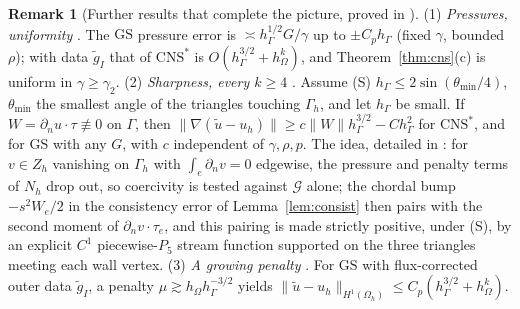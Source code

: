 \documentclass[5p,times]{elsarticle}
\theoremstyle{definition}
\newtheorem{remark}{Remark}
\newcommand{\hG}{h_\Gamma}
\newcommand{\hO}{h_\Omega}
\newcommand{\Gh}{\Gamma_h}
\newcommand{\Oh}{\Omega_h}
\newcommand{\Zh}{Z_h}
\newcommand{\dn}{\partial_n}
\newcommand{\ut}{\tilde u}
\newcommand{\norm}[1]{\lVert #1\rVert}
\newcommand{\GS}{\mathrm{GS}}
\newcommand{\CNS}{\mathrm{CNS}^\ast}
\newcommand{\Gc}{\mathcal G}
\newcommand{\ext}[1]{\cite[#1]{PadhiExt}}
\begin{document}
\begin{remark}[Further results that complete the picture, proved in \cite{PadhiExt}]\label{rem:further}
(1) \emph{Pressures, uniformity} \ext{Thms.~8.11, 8.7, 7.30, 7.33}. The $\GS$ pressure error is $\asymp\hG^{1/2}G/\gamma$ up to $\pm C_p\hG$ (fixed $\gamma$, bounded $\rho$); with data $\tilde g_I$ that of $\CNS$ is $O(\hG^{3/2}+\hO^k)$, and Theorem~\ref{thm:cns}(c) is uniform in $\gamma\ge\gamma_2$.
(2) \emph{Sharpness, every $k\ge4$} \ext{Thms.~7.8, 7.24}. Assume (S) $\hG\le2\sin(\theta_{\min}/4)$, $\theta_{\min}$ the smallest angle of the triangles touching $\Gh$, and let $\hG$ be small. If $W=\dn u\cdot\tau\not\equiv0$ on $\Gamma$, then $\norm{\nabla(\ut-u_h)}\ge c\norm W\hG^{3/2}-C\hG^2$ for $\CNS$, and for $\GS$ with any $G$, with $c$ independent of $\gamma,\rho,p$. The idea, detailed in \ext{Thm.~7.24}: for $v\in\Zh$ vanishing on $\Gh$ with $\int_e\dn v=0$ edgewise, the pressure and penalty terms of $N_h$ drop out, so coercivity is tested against $\Gc$ alone; the chordal bump $-s^2W_e/2$ in the consistency error of Lemma~\ref{lem:consist} then pairs with the second moment of $\dn v\cdot\tau_e$, and this pairing is made strictly positive, under (S), by an explicit $C^1$ piecewise-$P_5$ stream function supported on the three triangles meeting each wall vertex.
(3) \emph{A growing penalty} \ext{Thm.~7.30, Cor.~7.34}. For $\GS$ with flux-corrected outer data $\tilde g_I$, a penalty $\mu\gtrsim\hO\hG^{-3/2}$ yields $\norm{\ut-u_h}_{H^1(\Oh)}\le C_p(\hG^{3/2}+\hO^k)$.
\end{remark}
\end{document}
